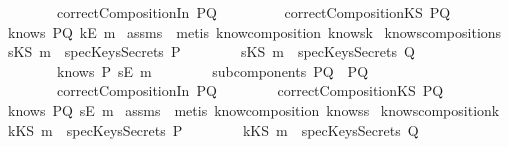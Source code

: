 \begin{isabellebody}
\ \ \ \ \ \ \ \ {\isachardoublequoteopen}correctCompositionIn\ PQ{\isachardoublequoteclose}\ \isanewline
\ \ \ \ \ \ \ \ {\isachardoublequoteopen}correctCompositionKS\ PQ{\isachardoublequoteclose}\isanewline
{}\ {\isachardoublequoteopen}knows\ PQ\ {\isacharbrackleft}kE\ m{\isacharbrackright}{\isachardoublequoteclose}\isanewline
\isadelimproof
\endisadelimproof
\isatagproof
{}\isamarkupfalse \ assms\ \isamarkupfalse \ {\isacharparenleft}metis\ know{\isacharunderscore}composition\ knows{}k{\isacharparenright}\endisatagproof
{\isafoldproof}\isadelimproof
\isanewline
\endisadelimproof
\isanewline
{}\isamarkupfalse \ knows{\isacharunderscore}composition{}{\isacharunderscore}s{\isacharcolon}\isanewline
{}\ {\isachardoublequoteopen}{\isacharparenleft}sKS\ m{\isacharparenright}\ {\isasymnotin}\ specKeysSecrets\ P{\isachardoublequoteclose}\isanewline
\ \ \ \ \ \ \ \ {\isachardoublequoteopen}{\isacharparenleft}sKS\ m{\isacharparenright}\ {\isasymnotin}\ specKeysSecrets\ Q{\isachardoublequoteclose}\isanewline
\ \ \ \ \ \ \ \ {\isachardoublequoteopen}knows\ P\ {\isacharbrackleft}sE\ m{\isacharbrackright}{\isachardoublequoteclose}\isanewline
\ \ \ \ \ \ \ \ {\isachardoublequoteopen}subcomponents\ PQ\ {\isacharequal}\ {\isacharbraceleft}P{\isacharcomma}Q{\isacharbraceright}{\isachardoublequoteclose}\ \isanewline
\ \ \ \ \ \ \ \ {\isachardoublequoteopen}correctCompositionIn\ PQ{\isachardoublequoteclose}\isanewline
\ \ \ \ \ \ \ \ {\isachardoublequoteopen}correctCompositionKS\ PQ{\isachardoublequoteclose}\isanewline
{}\ {\isachardoublequoteopen}knows\ PQ\ {\isacharbrackleft}sE\ m{\isacharbrackright}{\isachardoublequoteclose}\isanewline
\isadelimproof
\endisadelimproof
\isatagproof
{}\isamarkupfalse \ assms\ \isamarkupfalse \ {\isacharparenleft}metis\ know{\isacharunderscore}composition\ knows{}s{\isacharparenright}\endisatagproof
{\isafoldproof}\isadelimproof
\isanewline
\endisadelimproof
\isanewline
{}\isamarkupfalse \ knows{\isacharunderscore}composition{}{\isacharunderscore}k{\isacharcolon}\isanewline
{}\ {\isachardoublequoteopen}{\isacharparenleft}kKS\ m{\isacharparenright}\ {\isasymnotin}\ specKeysSecrets\ P{\isachardoublequoteclose}\isanewline
\ \ \ \ \ \ \ \ {\isachardoublequoteopen}{\isacharparenleft}kKS\ m{\isacharparenright}\ {\isasymnotin}\ specKeysSecrets\ Q{\isachardoublequoteclose}\isanewline

\end{isabellebody}
